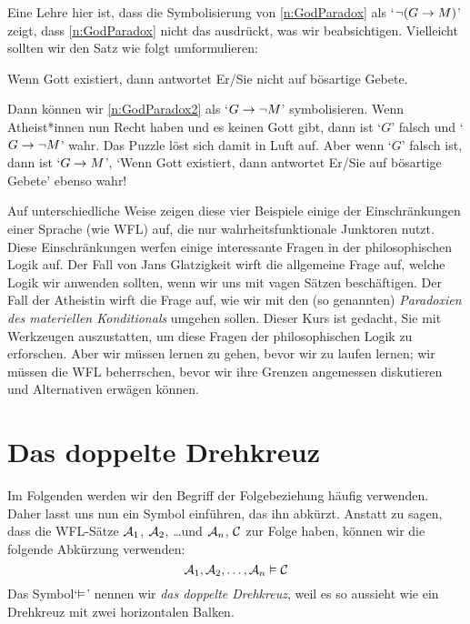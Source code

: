 Eine Lehre hier ist, dass die Symbolisierung von \ref{n:GodParadox} als `$\neg(G \rightarrow M)$' zeigt, dass \ref{n:GodParadox} nicht das ausdrückt, was wir beabsichtigen. Vielleicht sollten wir den Satz wie folgt umformulieren:
	\begin{earg}
	\setcounter{eargnum}{2}	
	\item\label{n:GodParadox2} Wenn Gott existiert, dann antwortet Er/Sie nicht auf bösartige Gebete.
	\end{earg}
Dann können wir \ref{n:GodParadox2} als `$G \rightarrow \neg M$' symbolisieren. Wenn Atheist*innen nun Recht haben und es keinen Gott gibt, dann ist `$G$' falsch und `$G \rightarrow \neg M$' wahr. Das Puzzle löst sich damit in Luft auf. Aber wenn `$G$' falsch ist, dann ist `$G \rightarrow M$', `Wenn Gott existiert, dann antwortet Er/Sie auf bösartige Gebete' ebenso wahr!
               
Auf unterschiedliche Weise zeigen diese vier Beispiele einige der Einschränkungen einer Sprache (wie WFL) auf, die nur wahrheitsfunktionale Junktoren nutzt. Diese Einschränkungen werfen einige interessante Fragen in der philosophischen Logik auf. Der Fall von Jans Glatzigkeit wirft die allgemeine Frage auf, welche Logik wir anwenden sollten, wenn wir uns mit vagen Sätzen beschäftigen. Der Fall der Atheistin wirft die Frage auf, wie wir mit den (so genannten) \emph{Paradoxien des materiellen Konditionals} umgehen sollen. Dieser Kurs ist gedacht, Sie mit Werkzeugen auszustatten, um diese Fragen der philosophischen Logik zu erforschen. Aber wir müssen lernen zu gehen, bevor wir zu laufen lernen; wir müssen die WFL beherrschen, bevor wir ihre Grenzen angemessen diskutieren und Alternativen erwägen können.                
                
\section{Das doppelte Drehkreuz}
Im Folgenden werden wir den Begriff der Folgebeziehung häufig verwenden. Daher lasst uns nun ein Symbol einführen, das ihn abkürzt. Anstatt zu sagen, dass die WFL-Sätze $\mathcal{A}_1$, $\mathcal{A}_2$, \dots und $\mathcal{A}_n$, $\mathcal{C}$ zur Folge haben, können wir die folgende Abkürzung verwenden:
	$$\mathcal{A}_1, \mathcal{A}_2, \dots, \mathcal{A}_n \vDash \mathcal{C}$$
Das Symbol`$\vDash$' nennen wir \emph{das doppelte Drehkreuz}, weil es so aussieht wie ein Drehkreuz mit zwei horizontalen Balken.

